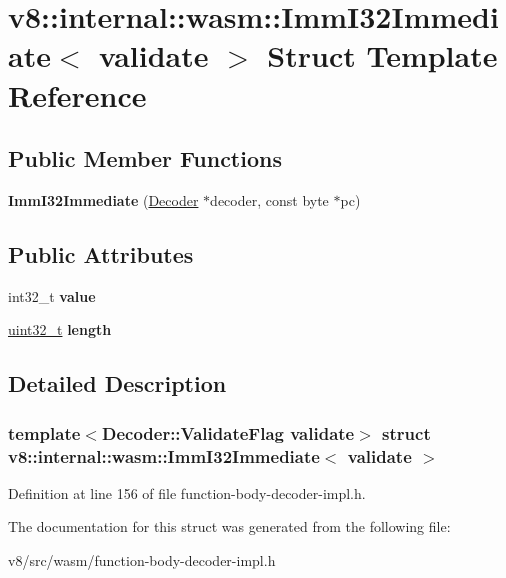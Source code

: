 \hypertarget{structv8_1_1internal_1_1wasm_1_1ImmI32Immediate}{}\section{v8\+:\+:internal\+:\+:wasm\+:\+:Imm\+I32\+Immediate$<$ validate $>$ Struct Template Reference}
\label{structv8_1_1internal_1_1wasm_1_1ImmI32Immediate}
\subsection*{Public Member Functions}
\begin{DoxyCompactItemize}
\item 
\mbox{\label{structv8_1_1internal_1_1wasm_1_1ImmI32Immediate_af5bcb44362f76fe4e6e75adaef816405}} 
{\bfseries Imm\+I32\+Immediate} (\mbox{\hyperlink{classv8_1_1internal_1_1wasm_1_1Decoder}{Decoder}} $\ast$decoder, const byte $\ast$pc)
\end{DoxyCompactItemize}
\subsection*{Public Attributes}
\begin{DoxyCompactItemize}
\item 
\mbox{\label{structv8_1_1internal_1_1wasm_1_1ImmI32Immediate_aef85766672922a0503e832159a303e63}} 
int32\+\_\+t {\bfseries value}
\item 
\mbox{\label{structv8_1_1internal_1_1wasm_1_1ImmI32Immediate_af7a4ace6fc46421be936f1016cedb9b3}} 
\mbox{\hyperlink{classuint32__t}{uint32\+\_\+t}} {\bfseries length}
\end{DoxyCompactItemize}


\subsection{Detailed Description}
\subsubsection*{template$<$Decoder\+::\+Validate\+Flag validate$>$\newline
struct v8\+::internal\+::wasm\+::\+Imm\+I32\+Immediate$<$ validate $>$}



Definition at line 156 of file function-\/body-\/decoder-\/impl.\+h.



The documentation for this struct was generated from the following file\+:\begin{DoxyCompactItemize}
\item 
v8/src/wasm/function-\/body-\/decoder-\/impl.\+h\end{DoxyCompactItemize}
